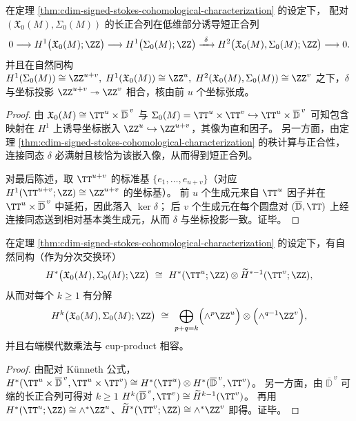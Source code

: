 \begin{proposition}\label{prop:cdim-stokes-exact-sequence-dictionary}
在定理 \ref{thm:cdim-signed-stokes-cohomological-characterization} 的设定下，
配对 \((\mathfrak X_0(M),\Sigma_0(M))\) 的长正合列在低维部分诱导短正合列
\[
0\longrightarrow H^{1}\bigl(\mathfrak X_0(M);\ZZ\bigr)
\longrightarrow H^{1}\bigl(\Sigma_0(M);\ZZ\bigr)
\xrightarrow{\ \delta\ }
H^{2}\bigl(\mathfrak X_0(M),\Sigma_0(M);\ZZ\bigr)
\longrightarrow 0.
\]
并且在自然同构
\(
H^{1}(\Sigma_0(M))\cong \ZZ^{u+v},\;
H^{1}(\mathfrak X_0(M))\cong \ZZ^{u},\;
H^{2}(\mathfrak X_0(M),\Sigma_0(M))\cong \ZZ^{v}
\)
之下，\(\delta\) 与坐标投影 \(\ZZ^{u+v}\twoheadrightarrow \ZZ^{v}\) 相合，核由前 \(u\) 个坐标张成。
\end{proposition}
\begin{proof}
由
\(
\mathfrak X_0(M)\cong \TT^{u}\times \overline{\mathbb D}^{\,v}
\)
与
\(
\Sigma_0(M)=\TT^{u}\times \TT^{v}\hookrightarrow \TT^{u}\times \overline{\mathbb D}^{\,v}
\)
可知包含映射在 \(H^{1}\) 上诱导坐标嵌入 \(\ZZ^{u}\hookrightarrow \ZZ^{u+v}\)，其像为直和因子。
另一方面，由定理 \ref{thm:cdim-signed-stokes-cohomological-characterization} 的秩计算与正合性，连接同态 \(\delta\) 必满射且核恰为该嵌入像，从而得到短正合列。
\par
对最后陈述，取 \(\TT^{u+v}\) 的标准基 \(\{e_1,\dots,e_{u+v}\}\)（对应 \(H^{1}(\TT^{u+v};\ZZ)\cong \ZZ^{u+v}\) 的坐标基）。
前 \(u\) 个生成元来自 \(\TT^{u}\) 因子并在 \(\TT^{u}\times \overline{\mathbb D}^{\,v}\) 中延拓，因此落入 \(\ker\delta\)；
后 \(v\) 个生成元在每个圆盘对 \((\overline{\mathbb D},\TT)\) 上经连接同态送到相对基本类生成元，从而 \(\delta\) 与坐标投影一致。证毕。
\end{proof}




\begin{proposition}\label{prop:cdim-stokes-relative-cohomology-ring}
在定理 \ref{thm:cdim-signed-stokes-cohomological-characterization} 的设定下，有自然同构（作为分次交换环）
\[
H^{*}\bigl(\mathfrak X_0(M),\Sigma_0(M);\ZZ\bigr)
\ \cong\
H^{*}(\TT^{u};\ZZ)\otimes \widetilde H^{*-1}(\TT^{v};\ZZ),
\]
从而对每个 \(k\ge 1\) 有分解
\[
H^{k}\bigl(\mathfrak X_0(M),\Sigma_0(M);\ZZ\bigr)
\ \cong\
\bigoplus_{p+q=k}\Bigl(\wedge^{p}\ZZ^{u}\Bigr)\otimes\Bigl(\wedge^{q-1}\ZZ^{v}\Bigr),
\]
并且右端楔代数乘法与 cup-product 相容。
\end{proposition}
\begin{proof}
由配对 Künneth 公式，
\(
H^{*}(\TT^{u}\times \overline{\mathbb D}^{\,v},\TT^{u}\times \TT^{v})
\cong
H^{*}(\TT^{u})\otimes H^{*}(\overline{\mathbb D}^{\,v},\TT^{v})
\)。
另一方面，由 \(\overline{\mathbb D}^{\,v}\) 可缩的长正合列可得对 \(k\ge 1\)
\(
H^{k}(\overline{\mathbb D}^{\,v},\TT^{v})\cong \widetilde H^{k-1}(\TT^{v})
\)。
再用 \(H^{*}(\TT^{u};\ZZ)\cong \wedge^{*}\ZZ^{u}\)、\(\widetilde H^{*}(\TT^{v};\ZZ)\cong \wedge^{*}\ZZ^{v}\) 即得。证毕。
\end{proof}

